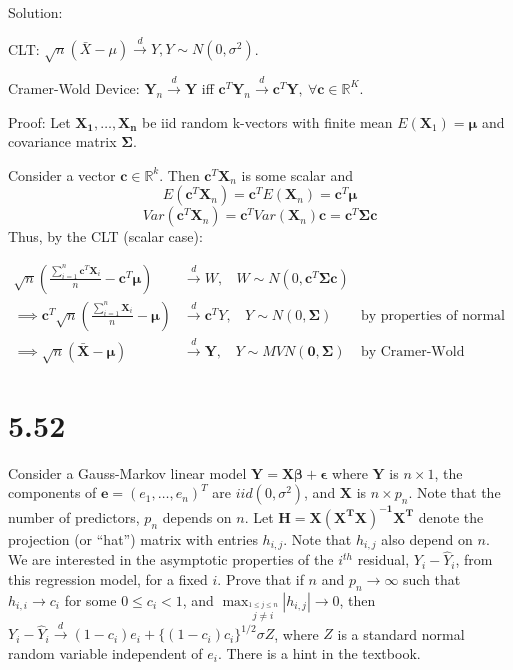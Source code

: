 \documentclass[
  letterpaper,
  DIV=11,
  numbers=noendperiod]{scrreprt}
\begin{document}
Solution:

CLT: \(\sqrt n (\bar X - \mu ) \overset d \to Y, Y \sim N(0,\sigma^2)\).

Cramer-Wold Device: \(\mathbf Y_n \overset d \to \mathbf Y\) iff
\(\mathbf c^T \mathbf Y_n \overset d \to \mathbf c ^T \mathbf Y ,~ \forall \mathbf c \in \mathbb R^K\).

Proof: Let \(\mathbf{X_1,\dots, X_n}\) be iid random k-vectors with
finite mean \(E(\mathbf X_1)= \boldsymbol \mu\) and covariance matrix
\(\boldsymbol \Sigma\).

Consider a vector \(\mathbf c \in \mathbb R ^k\). Then
\(\mathbf c^T \mathbf X_n\) is some scalar and
\[E(\mathbf c^T \mathbf X_n) = \mathbf c^T E(\mathbf X_n) = \mathbf c^T \boldsymbol  \mu\]
\[Var(\mathbf c^T \mathbf X_n) = \mathbf c^T Var(\mathbf X_n) \mathbf c = \mathbf c^T \boldsymbol \Sigma \mathbf c\]
Thus, by the CLT (scalar case):

\[
\begin{aligned}
\sqrt n \left(\frac {\sum_{i=1}^n \mathbf c^T \mathbf X_i}{n} - \mathbf c^T \boldsymbol  \mu \right) &\overset d \to W,~~~~W \sim N(0,\mathbf c^T \boldsymbol \Sigma \mathbf c) \\
\implies \mathbf c^T \sqrt n \left(\frac {\sum_{i=1}^n\mathbf X_i}{n} - \boldsymbol  \mu \right)& \overset d \to \mathbf c^T Y,~~~~Y \sim N(0, \boldsymbol \Sigma) &\text{by properties of normal distribution}\\
\implies \sqrt n \left(\mathbf {\bar X} - \boldsymbol  \mu \right)& \overset d \to \mathbf Y,~~~~Y \sim MVN(\mathbf 0, \boldsymbol \Sigma) & \text{by Cramer-Wold Device}
\end{aligned}
\] \newpage

\hypertarget{section-40}{%
\section{5.52}\label{section-40}}

Consider a Gauss-Markov linear model
\(\mathbf{Y= X} \boldsymbol{\beta} + \boldsymbol{\epsilon}\) where
\(\mathbf Y\) is \(n \times 1\), the components of
\(\mathbf e = (e_1,\dots, e_n)^T\) are \(iid(0,\sigma^2)\), and
\(\mathbf X\) is \(n \times p_n\). Note that the number of predictors,
\(p_n\) depends on \(n\). Let \(\mathbf{H=X(X^TX)^{-1}X^T}\) denote the
projection (or ``hat'') matrix with entries \(h_{i,j}\). Note that
\(h_{i,j}\) also depend on \(n\). We are interested in the asymptotic
properties of the \(i^{th}\) residual, \(Y_i- \hat{Y}_i\), from this
regression model, for a fixed \(i\). Prove that if \(n\) and
\(p_n \to \infty\) such that \(h_{i,i} \to c_i\) for some
\(0\leq c_i <1\), and
\(\max_{\overset{1\leq j \leq n}{j\neq i}} |h_{i,j}| \to 0\), then
\(Y_i- \hat{Y}_i \overset d \to (1-c_i)e_i+\{(1-c_i)c_i\}^{1/2}\sigma Z\),
where \(Z\) is a standard normal random variable independent of \(e_i\).
There is a hint in the textbook.
\end{document}

